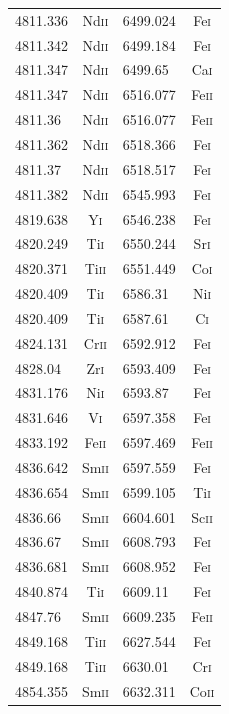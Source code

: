 \begin{longtable}[c]{|l|c|l|c|}
4811.336 & Nd\textsc{ii} & 6499.024 & Fe\textsc{i}\\ 
4811.342 & Nd\textsc{ii} & 6499.184 & Fe\textsc{i}\\ 
4811.347 & Nd\textsc{ii} & 6499.65 & Ca\textsc{i}\\  
4811.347 & Nd\textsc{ii} & 6516.077 & Fe\textsc{ii}\\
4811.36 & Nd\textsc{ii} & 6516.077 & Fe\textsc{ii}\\ 
4811.362 & Nd\textsc{ii} & 6518.366 & Fe\textsc{i}\\ 
4811.37 & Nd\textsc{ii} & 6518.517 & Fe\textsc{i}\\  
4811.382 & Nd\textsc{ii} & 6545.993 & Fe\textsc{i}\\ 
4819.638 & Y\textsc{i} & 6546.238 & Fe\textsc{i}\\   
4820.249 & Ti\textsc{i} & 6550.244 & Sr\textsc{i}\\  
4820.371 & Ti\textsc{ii} & 6551.449 & Co\textsc{i}\\ 
4820.409 & Ti\textsc{i} & 6586.31 & Ni\textsc{i}\\   
4820.409 & Ti\textsc{i} & 6587.61 & C\textsc{i}\\    
4824.131 & Cr\textsc{ii} & 6592.912 & Fe\textsc{i}\\ 
4828.04 & Zr\textsc{i} & 6593.409 & Fe\textsc{i}\\   
4831.176 & Ni\textsc{i} & 6593.87 & Fe\textsc{i}\\   
4831.646 & V\textsc{i} & 6597.358 & Fe\textsc{i}\\   
4833.192 & Fe\textsc{ii} & 6597.469 & Fe\textsc{ii}\\
4836.642 & Sm\textsc{ii} & 6597.559 & Fe\textsc{i}\\ 
4836.654 & Sm\textsc{ii} & 6599.105 & Ti\textsc{i}\\ 
4836.66 & Sm\textsc{ii} & 6604.601 & Sc\textsc{ii}\\ 
4836.67 & Sm\textsc{ii} & 6608.793 & Fe\textsc{i}\\  
4836.681 & Sm\textsc{ii} & 6608.952 & Fe\textsc{i}\\ 
4840.874 & Ti\textsc{i} & 6609.11 & Fe\textsc{i}\\   
4847.76 & Sm\textsc{ii} & 6609.235 & Fe\textsc{ii}\\ 
4849.168 & Ti\textsc{ii} & 6627.544 & Fe\textsc{i}\\ 
4849.168 & Ti\textsc{ii} & 6630.01 & Cr\textsc{i}\\  
4854.355 & Sm\textsc{ii} & 6632.311 & Co\textsc{ii}\\

\end{longtable}
